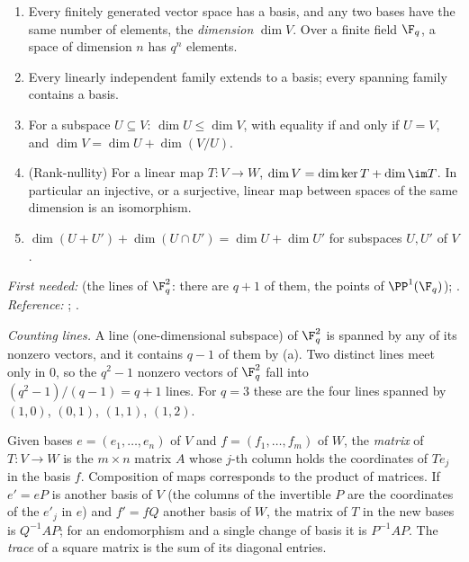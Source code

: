 \begin{theorem}\label{thm:prereq:dimension}
\begin{enumerate}[label=(\alph*)]
\item Every finitely generated vector space has a basis, and any two bases have the same number of
elements, the \emph{dimension} $\dim V$. Over a finite field $\F_q$, a space of dimension $n$ has
$q^n$ elements.
\item Every linearly independent family extends to a basis; every spanning family contains a basis.
\item For a subspace $U\subseteq V$: $\dim U\le\dim V$, with equality if and only if $U=V$, and
$\dim V=\dim U+\dim(V/U)$.
\item (Rank-nullity) For a linear map $T\colon V\to W$, $\dim V=\dim\ker T+\dim\im T$. In
particular an injective, or a surjective, linear map between spaces of the same dimension is an
isomorphism.
\item $\dim(U+U')+\dim(U\cap U')=\dim U+\dim U'$ for subspaces $U,U'$ of $V$.
\end{enumerate}
\end{theorem}
\noindent\emph{First needed:}  (the lines of $\F_q^2$: there are $q+1$ of them,
the points of $\PP^1(\F_q)$); . \emph{Reference:} \cite[Chapters 2 and 3]{Axler15};
\cite[Chapter 11]{DummitFoote}.

\emph{Counting lines.} A line (one-dimensional subspace) of $\F_q^2$ is spanned by any of its
nonzero vectors, and it contains $q-1$ of them by (a). Two distinct lines meet only in $0$, so the
$q^2-1$ nonzero vectors of $\F_q^2$ fall into $(q^2-1)/(q-1)=q+1$ lines. For $q=3$ these are the four
lines spanned by $(1,0)$, $(0,1)$, $(1,1)$, $(1,2)$.

\begin{definition}\label{def:prereq:matrices}
Given bases $e=(e_1,\dots,e_n)$ of $V$ and $f=(f_1,\dots,f_m)$ of $W$, the \emph{matrix} of
$T\colon V\to W$ is the $m\times n$ matrix $A$ whose $j$-th column holds the coordinates of $Te_j$
in the basis $f$. Composition of maps corresponds to the product of matrices. If $e'=eP$ is another
basis of $V$ (the columns of the invertible $P$ are the coordinates of the $e'_j$ in $e$) and
$f'=fQ$ another basis of $W$, the matrix of $T$ in the new bases is $Q^{-1}AP$; for an
endomorphism and a single change of basis it is $P^{-1}AP$. The \emph{trace} of a square matrix
is the sum of its diagonal entries.
\end{definition}

